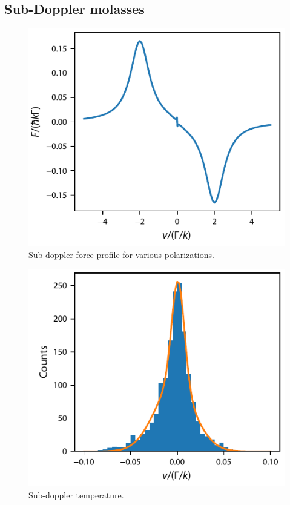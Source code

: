 \documentclass[final,5p,times,twocolumn]{elsarticle}
\begin{document}
\subsection{Sub-Doppler molasses}

\begin{figure}
	\center
	\includegraphics{figs/F2_to_F3_subDoppler_force}
	\caption{\label{fig:sub_doppler_force} Sub-doppler force profile for various polarizations.}
\end{figure}

\begin{figure}
	\center
	\includegraphics{figs/temperature_histogram_F2_to_F3}
	\caption{\label{fig:sub_doppler_temperature} Sub-doppler temperature.}
\end{figure}
\end{document}
